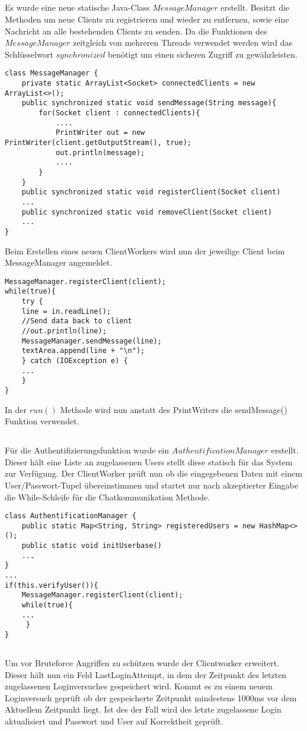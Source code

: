 \documentclass[12pt]{article}
\theoremstyle{plain}
\begin{document}
\subsection{}
Es wurde eine neue statische Java-Class $MessageManager$ erstellt.
Besitzt die Methoden um neue Clients zu registrieren und wieder zu entfernen, sowie eine Nachricht an alle bestehenden Clients zu senden.
Da die Funktionen des $MessageManager$ zeitgleich von mehreren Threads verwendet werden wird das Schlüsselwort $synchronized$ benötigt um einen sicheren Zugriff zu gewährleisten.
\begin{lstlisting}
class MessageManager {
	private static ArrayList<Socket> connectedClients = new ArrayList<>();
	public synchronized static void sendMessage(String message){
		for(Socket client : connectedClients){
			....			
			PrintWriter out = new PrintWriter(client.getOutputStream(), true);
			out.println(message);
			....
		}
	}
	public synchronized static void registerClient(Socket client)
	...
	public synchronized static void removeClient(Socket client)
	...
}
\end{lstlisting}
Beim Erstellen eines neuen ClientWorkers wird nun der jeweilige Client beim MessageManager angemeldet.
\begin{lstlisting}
MessageManager.registerClient(client);
while(true){
	try {
	line = in.readLine();
	//Send data back to client
	//out.println(line);
	MessageManager.sendMessage(line);
	textArea.append(line + "\n");
	} catch (IOException e) {
	...
	}
}
\end{lstlisting}
In der $run()$ Methode wird nun anstatt des PrintWriters die sendMessage() Funktion verwendet.
\subsection{}
Für die Authentifizierungsfunktion wurde ein $AuthentificationManager$ erstellt.
Dieser hält eine Liste an zugelassenen Users stellt diese statisch für das System zur Verfügung.
Der ClientWorker prüft nun ob die eingegebenen Daten mit einem User/Passwort-Tupel übereinstimmen und startet nur nach akzeptierter Eingabe die While-Schleife für die Chatkommunikation Methode.
\begin{lstlisting}
class AuthentificationManager {
	public static Map<String, String> registeredUsers = new HashMap<>();
	public static void initUserbase()
	...
}
...
if(this.verifyUser()){
	MessageManager.registerClient(client);
	while(true){
	...
	 }
}
\end{lstlisting}
\subsection{}
Um vor Bruteforce Angriffen zu schützen wurde der Clientworker erweitert. Dieser hält nun ein Feld LastLoginAttempt, in dem der Zeitpunkt des letzten zugelassenen Loginversuches gespeichert wird. Kommt es zu einem neuem Loginversuch geprüft ob der gespeicherte Zeitpunkt mindestens 1000ms vor dem Aktuellem Zeitpunkt liegt. Ist des der Fall wird des letzte zugelassene Login aktualisiert und Passwort und User auf Korrektheit geprüft.
\end{document}
